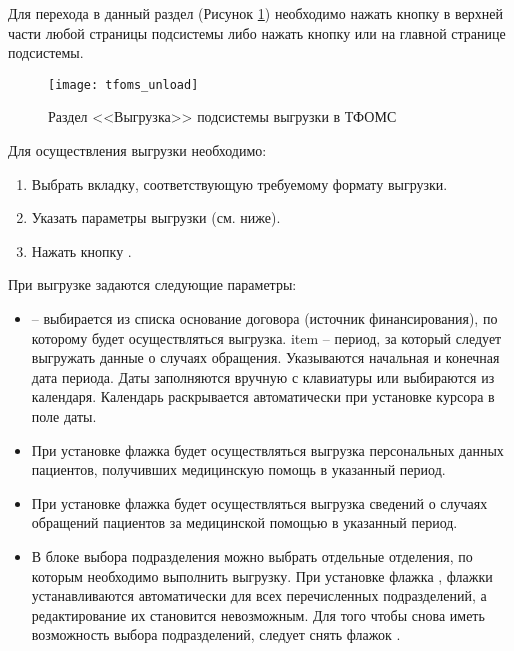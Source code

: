 Для перехода в данный раздел (Рисунок \ref{img_tfoms_unload}) необходимо нажать кнопку  в верхней части любой страницы подсистемы либо нажать кнопку   или   на главной странице подсистемы.

\begin{figure}[ht]\centering
 \texttt{[image: tfoms\_unload]}
 \caption{Раздел <<Выгрузка>> подсистемы выгрузки в ТФОМС}
 \label{img_tfoms_unload}
\end{figure}

Для осуществления выгрузки необходимо:
\begin{enumerate}
 \item Выбрать вкладку, соответствующую требуемому формату выгрузки.
 \item Указать параметры выгрузки (см. ниже).
 \item Нажать кнопку .
\end{enumerate}

При выгрузке задаются следующие параметры:
\begin{itemize}
 \item {} – выбирается из списка основание договора (источник финансирования), по которому будет осуществляться выгрузка.
 item  – период, за который следует выгружать данные о случаях обращения. Указываются начальная и конечная дата периода. Даты заполняются вручную с клавиатуры или выбираются из календаря. Календарь раскрывается автоматически при установке курсора в поле даты.
 \item При установке флажка  будет осуществляться выгрузка персональных данных пациентов, получивших медицинскую помощь в указанный период.
 \item При установке флажка  будет осуществляться выгрузка сведений о случаях обращений пациентов за медицинской помощью в указанный период.
 \item В блоке выбора подразделения можно выбрать отдельные отделения, по которым необходимо выполнить выгрузку. При установке флажка , флажки устанавливаются автоматически для всех перечисленных подразделений, а редактирование их становится невозможным. Для того чтобы снова иметь возможность выбора подразделений, следует снять флажок .
\end{itemize}
 
